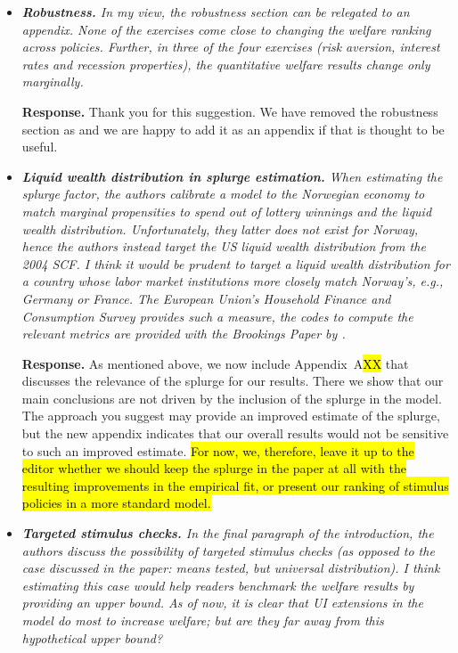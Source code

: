 \documentclass[12pt,letterpaper,english]{article}
\begin{document}
\begin{itemize}
	\item \textit{\textbf{Robustness.} In my view, the robustness section can be relegated to an appendix. None of the exercises come close to changing the welfare ranking across policies. Further, in three of the four exercises
		(risk aversion, interest rates and recession properties), the quantitative welfare results change only marginally.}
	
	\noindent \textbf{Response.} Thank you for this suggestion. We have removed the robustness section as and we are happy to add it as an appendix if that is thought to be useful.
	
	\item \textit{\textbf{Liquid wealth distribution in splurge estimation.} When estimating the splurge factor, the authors calibrate a model to the Norwegian economy to match marginal propensities to spend out of lottery winnings and the liquid wealth distribution. Unfortunately, they latter does not exist for Norway, hence the authors instead target the US liquid wealth distribution from the 2004 SCF. I think it would be prudent to target a liquid wealth distribution for a country whose labor market institutions more closely match Norway’s, e.g., Germany or France. The European Union’s Household Finance and Consumption Survey provides such a measure, the codes to compute the relevant metrics are provided with the Brookings Paper by \citet{kaplan2014wealthy}.}
	
	\noindent \textbf{Response.} As mentioned above, we now include Appendix~A\hl{XX} that discusses the relevance of the splurge for our results. There we show that our main conclusions are not driven by the inclusion of the splurge in the model. The approach you suggest may provide an improved estimate of the splurge, but the new appendix indicates that our overall results would not be sensitive to such an improved estimate. \hl{For now, we, therefore, leave it up to the editor whether we should keep the splurge in the paper at all with the resulting improvements in the empirical fit, or present our ranking of stimulus policies in a more standard model.}
	
	\item \textit{\textbf{Targeted stimulus checks.} In the final paragraph of the introduction, the authors discuss the possibility of targeted stimulus checks (as opposed to the case discussed in the paper: means tested, but universal distribution). I think estimating this case would help readers benchmark the welfare results by providing an upper bound. As of now, it is clear that UI extensions in the model do most to increase welfare; but are they far away from this hypothetical upper bound?}
	

\end{itemize}
\end{document}

